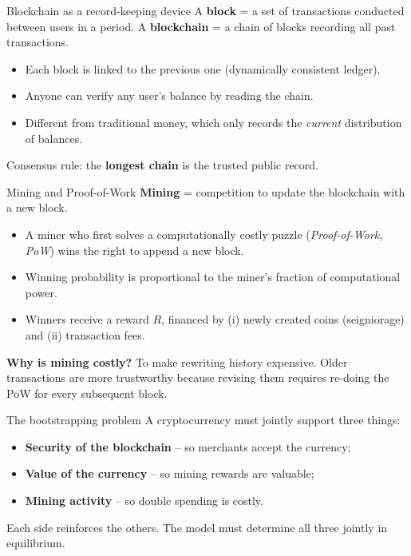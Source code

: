 \documentclass[aspectratio=169,xcolor=dvipsnames]{beamer}
\begin{document}
\begin{frame}{Blockchain as a record-keeping device}
    A \textbf{block} = a set of transactions conducted between users in a period.
    A \textbf{blockchain} = a chain of blocks recording all past transactions.
    \vspace{3mm}
    \begin{itemize}
        \item Each block is linked to the previous one (dynamically consistent ledger).
        \item Anyone can verify any user's balance by reading the chain.
        \item Different from traditional money, which only records the \emph{current}
              distribution of balances.
    \end{itemize}
    \vspace{3mm}
    Consensus rule: the \textbf{longest chain} is the trusted public record.
\end{frame}

\begin{frame}{Mining and Proof-of-Work}
    \textbf{Mining} = competition to update the blockchain with a new block.
    \vspace{2mm}
    \begin{itemize}
        \item A miner who first solves a computationally costly puzzle (\emph{Proof-of-Work, PoW})
        wins the right to append a new block.
        \item Winning probability is proportional to the miner's fraction of computational power.
        \item Winners receive a reward $R$, financed by (i) newly created coins (seigniorage)
              and (ii) transaction fees.
    \end{itemize}
    \vspace{3mm}
    \textbf{Why is mining costly?} To make rewriting history expensive. Older transactions
    are more trustworthy because revising them requires re-doing the PoW for every subsequent block.
\end{frame}

\begin{frame}{The bootstrapping problem}
    A cryptocurrency must jointly support three things:
    \vspace{2mm}
    \begin{itemize}
        \item \textbf{Security of the blockchain} -- so merchants accept the currency;
        \item \textbf{Value of the currency} -- so mining rewards are valuable;
        \item \textbf{Mining activity} -- so double spending is costly.
    \end{itemize}
    \vspace{3mm}
    Each side reinforces the others. The model must determine all three jointly in equilibrium.
\end{frame}
\end{document}
